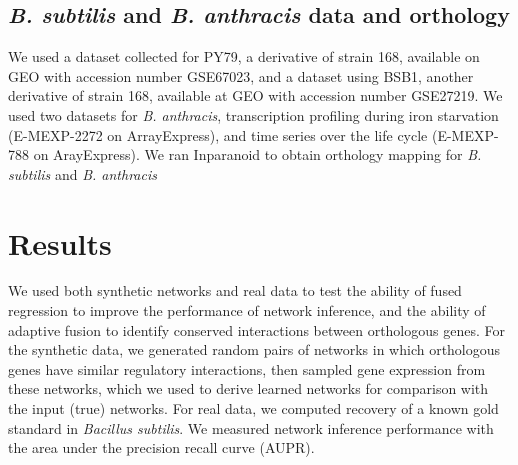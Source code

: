 \documentclass[11pt]{article}
\begin{document}
\subsection{\textit{B. subtilis} and \textit{B. anthracis} data and orthology}
We used a dataset collected for PY79, a derivative of strain 168, available on GEO with accession number GSE67023, and a dataset using BSB1, another derivative of strain 168, available at GEO with accession number GSE27219. We used two datasets for \textit{B. anthracis}, transcription profiling during iron starvation (E-MEXP-2272 on ArrayExpress), and time series over the life cycle (E-MEXP-788 on ArayExpress). We ran Inparanoid to obtain orthology mapping for \textit{B. subtilis} and \textit{B. anthracis} \cite{ostlund_inparanoid_2010}

\section{Results}
We used both synthetic networks and real data to test the ability of fused regression to improve the performance of network inference, and the ability of adaptive fusion to identify conserved interactions between orthologous genes. For the synthetic data, we generated random pairs of networks in which orthologous genes have similar regulatory interactions, then sampled gene expression from these networks, which we used to derive learned networks for comparison with the input (true) networks. For real data, we computed recovery of a known gold standard in \textit{Bacillus subtilis}. We measured network inference performance with the area under the precision recall curve (AUPR). 
\end{document}

